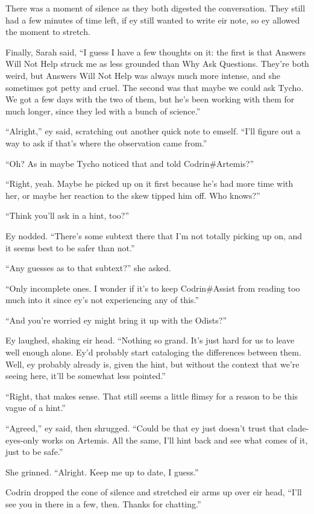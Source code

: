 There was a moment of silence as they both digested the conversation. They still had a few minutes of time left, if ey still wanted to write eir note, so ey allowed the moment to stretch.

Finally, Sarah said, ``I guess I have a few thoughts on it: the first is that Answers Will Not Help struck me as less grounded than Why Ask Questions. They're both weird, but Answers Will Not Help was always much more intense, and she sometimes got petty and cruel. The second was that maybe we could ask Tycho. We got a few days with the two of them, but he's been working with them for much longer, since they led with a bunch of science.''

``Alright,'' ey said, scratching out another quick note to emself. ``I'll figure out a way to ask if that's where the observation came from.''

``Oh? As in maybe Tycho noticed that and told Codrin\#Artemis?''

``Right, yeah. Maybe he picked up on it first because he's had more time with her, or maybe her reaction to the skew tipped him off. Who knows?''

``Think you'll ask in a hint, too?''

Ey nodded. ``There's some subtext there that I'm not totally picking up on, and it seems best to be safer than not.''

``Any guesses as to that subtext?'' she asked.

``Only incomplete ones. I wonder if it's to keep Codrin\#Assist from reading too much into it since ey's not experiencing any of this.''

``And you're worried ey might bring it up with the Odists?''

Ey laughed, shaking eir head. ``Nothing so grand. It's just hard for us to leave well enough alone. Ey'd probably start cataloging the differences between them. Well, ey probably already is, given the hint, but without the context that we're seeing here, it'll be somewhat less pointed.''

``Right, that makes sense. That still seems a little flimsy for a reason to be this vague of a hint.''

``Agreed,'' ey said, then shrugged. ``Could be that ey just doesn't trust that clade-eyes-only works on Artemis. All the same, I'll hint back and see what comes of it, just to be safe.''

She grinned. ``Alright. Keep me up to date, I guess.''

Codrin dropped the cone of silence and stretched eir arms up over eir head, ``I'll see you in there in a few, then. Thanks for chatting.''

